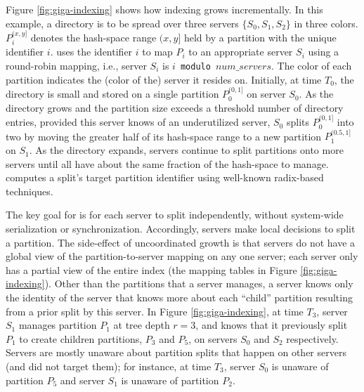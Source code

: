 Figure \ref{fig:giga-indexing} shows how \giga{} indexing grows incrementally.
In this example, a directory is to be spread over three servers 
$\{S_0, S_1, S_2\}$ in three colors.
$P_i^{(x,y]}$ denotes the hash-space range $(x,y]$ held by a partition with the
unique identifier $i$.
\giga{} uses the identifier $i$ to map $P_i$ to an appropriate server $S_i$
using a round-robin mapping, 
i.e., server $S_i$ is $i$~\texttt{\small{modulo}}~$num\_servers$.
The color of each partition indicates the (color of the) server it resides on. 
Initially, at time $T_0$, the directory is small and stored on a single 
partition $P_0^{(0,1]}$ on server $S_0$.
As the directory grows and the partition size exceeds a threshold number of
directory entries, 
provided this server knows of an underutilized server, 
$S_0$ splits $P_0^{(0,1]}$ into two by moving the greater half of its
hash-space range to a new partition $P_1^{(0.5,1]}$ on $S_1$.
As the directory expands, servers continue to split partitions onto 
more servers until all have about the same fraction of the hash-space
to manage. 
\giga{} computes a split's target partition identifier using well-known 
radix-based techniques.

The key goal for \giga{} is for each server to split independently,
without system-wide serialization or synchronization.
Accordingly, servers make local decisions to split a partition. 
The side-effect of uncoordinated growth is that \giga{} servers do not have 
a global view of the partition-to-server mapping on any one server; each server 
only has a partial view of the entire index (the mapping tables in Figure 
\ref{fig:giga-indexing}).
Other than the partitions that a server manages, a server knows only the
identity of the server that knows more about each ``child'' partition resulting
from a prior split by this server.
In Figure \ref{fig:giga-indexing}, at time $T_3$, server $S_1$ manages partition
$P_1$ at tree depth $r = 3$, and knows that it previously split $P_1$ to create 
children partitions, $P_3$ and $P_5$, on servers $S_0$ and $S_2$ respectively.
Servers are mostly unaware about partition splits that happen 
on other servers (and did not target them); for instance, at time $T_3$, 
server $S_0$ is unaware of 
partition $P_5$ and server $S_1$ is unaware of partition $P_2$.

